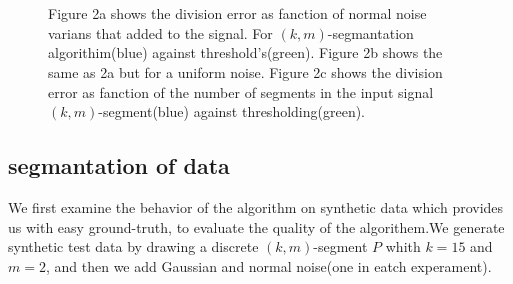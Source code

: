 \documentclass{vldb}
\begin{document}
\begin{figure}[H]
\centering
{} \\
\\
\centering{}
\caption{Figure 2a shows the division error as fanction of normal noise varians that added to the signal. For $(k,m)$-segmantation algorithim(blue) against threshold's(green). Figure 2b shows the same as 2a but for a uniform noise. Figure 2c shows the division error as fanction of the number of segments in the input signal $(k,m)$-segment(blue) against  thresholding(green).  }
\label{noise}
\end{figure}
\subsection{segmantation of data}
We first examine the behavior of the algorithm on synthetic data which provides us with
easy ground-truth, to evaluate the quality of the algorithem.We generate synthetic test data by drawing a discrete $(k,m)$-segment $P$ whith $k=15$ and $m=2$, and then we add Gaussian and normal noise(one in eatch experament).
\end{document}
